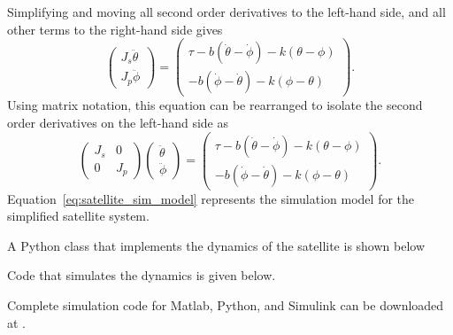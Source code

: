 Simplifying and moving all second order derivatives to the left-hand side, and all other terms to the right-hand side gives
\[
\begin{pmatrix}
J_s\ddot{\theta} \\
J_p\ddot{\phi}
\end{pmatrix}
= \begin{pmatrix}  \tau -b(\dot{\theta}-\dot{\phi})-k(\theta-\phi) \\ -b(\dot{\phi}-\dot{\theta}) - k(\phi-\theta) \end{pmatrix}.
\]
Using matrix notation, this equation can be rearranged to isolate the second order derivatives on the left-hand side as
\begin{equation}\label{eq:satellite_sim_model}
\begin{pmatrix}
J_s & 0 \\ 
0 & J_p
\end{pmatrix} \begin{pmatrix}\ddot{\theta} \\ \ddot{\phi} \end{pmatrix}
= \begin{pmatrix} \tau-b(\dot{\theta}-\dot{\phi})-k(\theta-\phi) \\ -b(\dot{\phi}-\dot{\theta}) - k(\phi-\theta) \end{pmatrix}.
\end{equation}
Equation~\eqref{eq:satellite_sim_model} represents the simulation model for the simplified satellite system.

A Python class that implements the dynamics of the satellite is shown below


Code that simulates the dynamics is given below.


Complete simulation code for Matlab, Python, and Simulink can be downloaded at .


